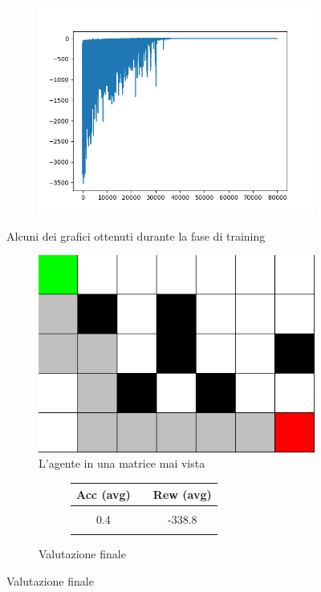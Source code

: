 \begin{figure}[H]
\begin{subfigure}{.25\textwidth}
	\end{subfigure}%
	\begin{subfigure}{.25\textwidth}
		\includegraphics[width=\textwidth]{img/train/matrice_19-12_02_37.png}
	\end{subfigure}%
	\caption{Alcuni dei grafici ottenuti durante la fase di training}
\end{figure}

\begin{figure}[H]
	\begin{subfigure}[b]{.5\textwidth}
		\centering
		\includegraphics[width=.7\textwidth]{img/terzo_success.png}
		\caption{L'agente in  una matrice mai vista}
	\end{subfigure}%
	\begin{subfigure}[b]{.5\textwidth}
	\centering
	\begin{figure}[H]
		\centering
		\begin{tabular}{c c c}
			\textbf{Acc (avg)}& \vline & \textbf{Rew (avg)}\\
			\hline
			& \vline & \\ [.01em]
			0.4 & \vline & -338.8 \\ [1.5em]
			& & \\ 
		\end{tabular}
	\end{figure}
	\caption{Valutazione finale}
\end{subfigure}%
\end{figure}

